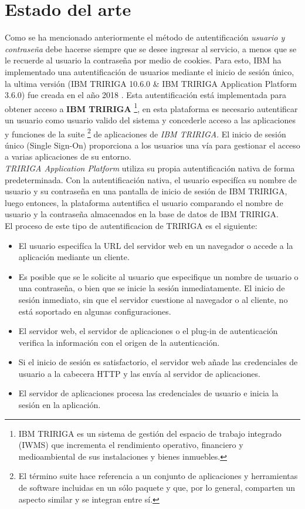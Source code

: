 \documentclass[12pt, a4paper, titlepage]{report}
\begin{document}
    \section{Estado del arte}
    Como se ha mencionado anteriormente el método de autentificación \textit{usuario y contraseña} debe hacerse siempre que se desee ingresar al servicio, a menos que se le recuerde al usuario la contraseña por medio de cookies. Para esto, IBM ha implementado una autentificación de usuarios mediante el inicio de sesión único, la ultima versión (IBM TRIRIGA 10.6.0 \& IBM TRIRIGA Application Platform 3.6.0) fue creada en el año 2018 \cite{refIBMTRIRIGAYear}. Esta autentificación está implementada para obtener acceso a \textbf{IBM TRIRIGA} \footnote{IBM TRIRIGA es un sistema de gestión del espacio de trabajo integrado (IWMS) que incrementa el rendimiento operativo, financiero y medioambiental de sus instalaciones y bienes inmuebles.}, en esta plataforma es necesario autentificar un usuario como usuario valido del sistema y concederle acceso a las aplicaciones y funciones de la suite \footnote{El término suite hace referencia a un conjunto de aplicaciones y herramientas de software incluidas en un sólo paquete y que, por lo general, comparten un aspecto similar y se integran entre sí.} de aplicaciones de \textit{IBM TRIRIGA}. El inicio de sesión único (\Gls{Single Sign-On}) proporciona a los usuarios una vía para gestionar el acceso a varias aplicaciones de su entorno. \\
    \textit{TRIRIGA Application Platform} utiliza su propia autentificación nativa de forma predeterminada. Con la autentificación nativa, el usuario especifíca su nombre de usuario y su contraseña en una pantalla de inicio de sesión de IBM TRIRIGA, luego entonces, la plataforma autentifica el usuario comparando el nombre de usuario y la contraseña almacenados en la base de datos de IBM TRIRIGA.\cite{refIBMTRIRIGA} \\
    El proceso de este tipo de autentificacion de TRIRIGA es el siguiente:
    \begin{itemize}
        \item El usuario especifíca la URL del servidor web en un navegador o accede a la aplicación mediante un cliente.
        \item Es posible que se le solicite al usuario que especifique un nombre de usuario o una contraseña, o bien que se inicie la sesión inmediatamente. El inicio de sesión inmediato, sin que el servidor cuestione al navegador o al cliente, no está soportado en algunas configuraciones.
        \item El servidor web, el servidor de aplicaciones o el plug-in de autenticación verifica la información con el origen de la autenticación.
        \item Si el inicio de sesión es satisfactorio, el servidor web añade las credenciales de usuario a la cabecera HTTP y las envía al servidor de aplicaciones.
        \item El servidor de aplicaciones procesa las credenciales de usuario e inicia la sesión en la aplicación.
    \end{itemize}
    
\end{document}
